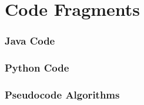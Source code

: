 \section{Code Fragments}
    \begin{frame}
        \frametitle{Java Code}

    \end{frame}

    \begin{frame}
        \frametitle{Python Code}
    \end{frame}
    
    \begin{frame}
        \frametitle{Pseudocode Algorithms}
    \end{frame}
